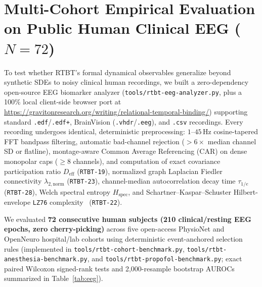 \documentclass[11pt,letterpaper]{article}
\newcommand{\code}[1]{\texttt{\small #1}}
\begin{document}
\section{Multi-Cohort Empirical Evaluation on Public Human Clinical EEG (\texorpdfstring{$N=72$}{N=72})}

To test whether RTBT's formal dynamical observables generalize beyond synthetic SDEs to noisy clinical human recordings, we built a zero-dependency open-source EEG biomarker analyzer (\code{tools/rtbt-eeg-analyzer.py}, plus a 100\% local client-side browser port at \url{https://gravitonresearch.org/writing/relational-temporal-binding/}) supporting standard \code{.edf}/\code{.edf+}, BrainVision (\code{.vhdr}/\code{.eeg}), and \code{.csv} recordings. Every recording undergoes identical, deterministic preprocessing: $1$--$45\,\mathrm{Hz}$ cosine-tapered FFT bandpass filtering, automatic bad-channel rejection ($>6\times$ median channel SD or flatline), montage-aware Common Average Referencing (CAR) on dense monopolar caps ($\ge 8$ channels), and computation of exact covariance participation ratio $D_{\mathrm{eff}}$ (\code{RTBT-19}), normalized graph Laplacian Fiedler connectivity $\lambda_{2,\mathrm{norm}}$ (\code{RTBT-23}), channel-median autocorrelation decay time $\tau_{1/e}$ (\code{RTBT-28}), Welch spectral entropy $H_{\mathrm{spec}}$, and Schartner--Kaspar--Schuster Hilbert-envelope \code{LZ76} complexity~\cite{Schartner2015} (\code{RTBT-22}).

We evaluated \textbf{72 consecutive human subjects (210 clinical/resting EEG epochs, zero cherry-picking)} across five open-access PhysioNet and OpenNeuro hospital/lab cohorts using deterministic event-anchored selection rules (implemented in \code{tools/rtbt-cohort-benchmark.py}, \code{tools/rtbt-anesthesia-benchmark.py}, and \code{tools/rtbt-propofol-benchmark.py}; exact paired Wilcoxon signed-rank tests and 2{,}000-resample bootstrap AUROCs summarized in Table~\ref{tab:eeg}).
\end{document}
